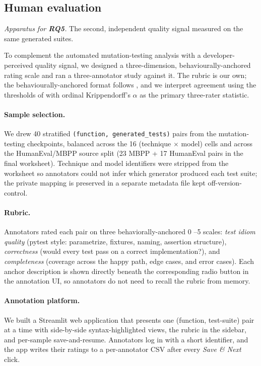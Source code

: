 \documentclass[smallextended]{svjour3}
\begin{document}
\subsection{Human evaluation}\label{sec:methods-humaneval}

\emph{Apparatus for \textbf{RQ5}.} The second, independent quality signal
measured on the same generated suites.


To complement the automated mutation-testing analysis with a
developer-perceived quality signal, we designed a three-dimension, behaviourally-anchored rating scale and ran a three-annotator study against it. The rubric is our own; the behaviourally-anchored format follows \citet{smith1963}, and we interpret agreement using the thresholds of \citet{landis1977} with ordinal Krippendorff's $\alpha$ \citep{krippendorff2018} as the primary three-rater statistic.

\paragraph{Sample selection.}
We drew 40 stratified \texttt{(function, generated\_tests)} pairs
from the mutation-testing checkpoints, balanced across the 16
(technique $\times$ model) cells and across the HumanEval/MBPP source
split (23 MBPP + 17 HumanEval pairs in the final worksheet).
Technique and model identifiers were stripped from the worksheet so
annotators could not infer which generator produced each test
suite; the private mapping is preserved in a separate metadata
file kept off-version-control.

\paragraph{Rubric.}
Annotators rated each pair on three behaviorally-anchored 0
–5 scales: \emph{test idiom quality} (pytest style: parametrize,
fixtures, naming, assertion structure), \emph{correctness} (would
every test pass on a correct implementation?), and
\emph{completeness} (coverage across the happy path, edge cases, and
error cases). Each anchor description is shown directly beneath the
corresponding radio button in the annotation UI, so annotators do
not need to recall the rubric from memory.

\paragraph{Annotation platform.}
We built a Streamlit web application that presents one
(function, test-suite) pair at a time with side-by-side
syntax-highlighted views, the rubric in the sidebar, and per-sample
save-and-resume. Annotators log in with a short identifier, and the
app writes their ratings to a per-annotator CSV after every
\emph{Save \& Next} click.
\end{document}
